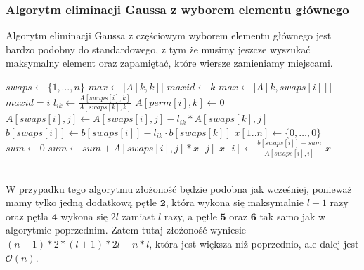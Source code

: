 \documentclass{article}
\begin{document}
\subsubsection{Algorytm eliminacji Gaussa z wyborem elementu głównego}
Algorytm eliminacji Gaussa z częściowym wyborem elementu głównego jest bardzo podobny do standardowego, z tym że musimy jeszcze wyszukać maksymalny element oraz zapamiętać, które wiersze zamieniamy miejscami.
\begin{algorithm}
    \begin{algorithmic}[1]
            \State $swaps \gets \lbrace 1, \ldots, n \rbrace$
             
                \State $max \gets |A[k,k]|$
                \State $maxid \gets k$
                 
                        \State $max \gets |A[k,swaps[i]]|$
                        \State $maxid = i$
                    \EndIf
                \EndFor
                \State {}
                 
                    \State $l_{ik} \gets \frac{A[swaps[i], k]}{A[swaps[k], k]}$
                    \State $A[perm[i], k] \gets 0$
                     
                        \State $A[swaps[i], j] \gets A[swaps[i], j] - l_{ik}*A[swaps[k], j]$
                    \EndFor
                    \State $b[swaps[i]] \gets b[swaps[i]] - l_{ik} \cdot b[swaps[k]]$
                \EndFor
            \EndFor
            \State $x[1..n] \gets \lbrace 0, \ldots, 0 \rbrace$
             
                \State $sum \gets 0$
                 
                    \State $sum \gets sum + A[swaps[i], j] * x[j]$
                \EndFor
                \State $x[i] \gets \frac{b[swaps[i]] - sum}{A[swaps[i],i]}$
            \EndFor
            \State \Return $x$
        \EndFunction
    \end{algorithmic}
\end{algorithm}\\ 
 W przypadku tego algorytmu złożoność będzie podobna jak wcześniej, ponieważ mamy tylko jedną dodatkową pętle $\mathbf{2}$, która wykona się maksymalnie $l+1$ razy oraz pętla $\mathbf{4}$ wykona się $2l$ zamiast $l$ razy, a pętle $\mathbf{5}$ oraz $\mathbf{6}$ tak samo jak w algorytmie poprzednim. Zatem tutaj złożoność wyniesie $(n-1)*2*(l+1)*2l + n*l$, która jest większa niż poprzednio, ale dalej jest $\mathcal{O}(n)$.
\end{document}
